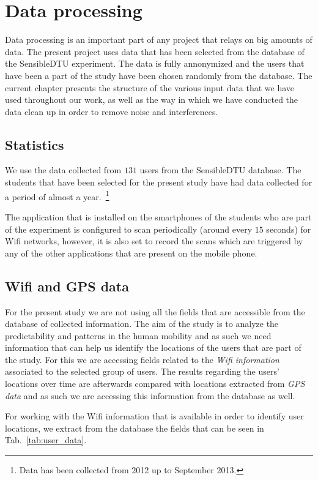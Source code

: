 \chapter{Data processing}
Data processing is an important part of any project that relays on big amounts
of data. The present project uses data that has been selected from the database
of the SensibleDTU experiment. The data is fully annonymized and the users that
have been a part of the study have been chosen randomly from the database. The
current chapter presents the structure of the various input data that we have
used throughout our work, as well as the way in which we have conducted the data
clean up in order to remove noise and interferences.

\section{Statistics}
We use the data collected from $131$ users from the SensibleDTU database. The
students that have been selected for the present study have had data collected
for a period of almost a year.~\footnote{Data has been collected from 2012 up to
September 2013.}

The application that is installed on the smartphones of the students who are
part of the experiment is configured to scan periodically (around every $15$
seconds) for Wifi networks, however, it is also set to record the scans which
are triggered by any of the other applications that are present on the mobile
phone.

\section{Wifi and GPS data}
\label{data_structures}
For the present study we are not using all the fields that are accessible from
the database of collected information. The aim of the study is to analyze the
predictability and patterns in the human mobility and as such we need
information that can help us identify the locations of the users that are part
of the study. For this we are accessing fields related to the \textit{Wifi
information} associated to the selected group of users. The results regarding
the users' locations over time are afterwards compared with locations extracted
from \textit{GPS data} and as such we are accessing this information from the
database as well.

For working with the Wifi information that is available in order to identify
user locations, we extract from the database the fields that can be seen in
Tab.~\ref{tab:user_data}.

